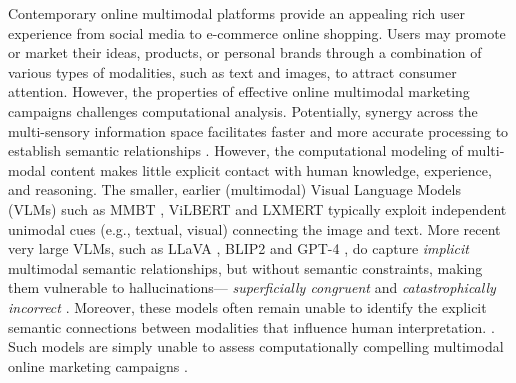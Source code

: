 Contemporary online multimodal platforms 
provide an appealing rich user experience from social media to e-commerce online shopping. 
Users 
may promote or market their ideas, products, or personal brands through a combination of various types of modalities, such as text and images, to 
attract consumer attention.
However, the 
properties of effective online multimodal marketing campaigns %
challenges computational analysis.
Potentially, synergy across the multi-sensory information space facilitates faster and more accurate processing to establish semantic relationships \cite{laurienti2004semantic,spence2011crossmodal,wickens2008multiple}. However, 
the computational modeling of multi-modal content 
makes little explicit contact with human knowledge, experience, and reasoning.
The smaller, earlier (multimodal) Visual Language Models (VLMs) such as MMBT \cite{kiela2020supervised}, ViLBERT \cite{lu2019vilbert} and LXMERT \cite{tan2019lxmert} 
typically exploit independent unimodal cues (e.g., textual, visual) connecting the image and text.
More recent very large VLMs, such as LLaVA \cite{liu2023visual}, BLIP2 \cite{li2023blip} and GPT-4 \cite{openai2023gpt4}, do capture  \emph{implicit} multimodal semantic relationships,  but without semantic constraints, making them vulnerable to 
hallucinations--- \emph{superficially congruent} \cite{hasanyou,Meyer2022-cf} and  \emph{catastrophically incorrect} \cite{shuster2021retrieval,Maynez2020-cj}. Moreover, these models often remain unable to identify the explicit semantic connections between modalities that influence human interpretation. \cite{ji2020leveraging}. 
Such models are simply %
unable to  assess computationally compelling multimodal online marketing campaigns 
\cite{mcguffie2020radicalization,weidinger2022taxonomy,tamkin2021understanding,de2023chatgpt}. 


